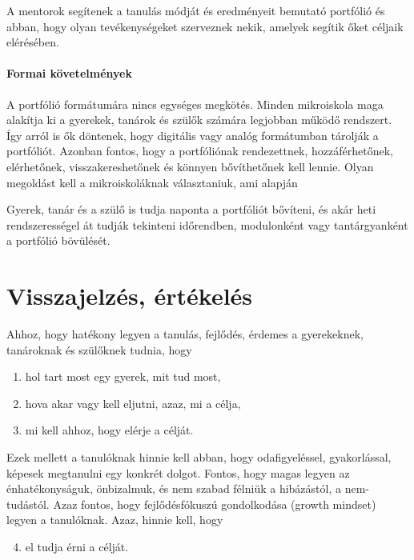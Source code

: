 A mentorok segítenek a tanulás módját és eredményeit bemutató portfólió és abban, hogy olyan tevékenységeket szerveznek nekik, amelyek segítik őket céljaik elérésében.

\paragraph{Formai követelmények}
A portfólió formátumára nincs egységes megkötés. Minden mikroiskola maga alakítja ki a gyerekek, tanárok és szülők számára legjobban működő rendszert. Így arról is ők döntenek, hogy digitális vagy analóg formátumban tárolják a portfóliót. Azonban fontos, hogy a portfóliónak rendezettnek, hozzáférhetőnek, elérhetőnek, visszakereshetőnek és könnyen bővíthetőnek kell lennie. Olyan megoldást kell a mikroiskoláknak választaniuk, ami alapján

Gyerek, tanár és a szülő is tudja naponta a portfóliót bővíteni, és akár heti rendszerességel át tudják tekinteni időrendben, modulonként vagy tantárgyanként a portfólió bövülését.

\section{Visszajelzés, értékelés}
\label{sec:ertekeles}
Ahhoz, hogy hatékony legyen a tanulás, fejlődés, érdemes a gyerekeknek, tanároknak és szülőknek tudnia, hogy
\begin{enumerate}
\item hol tart most egy gyerek, mit tud most,
\item hova akar vagy kell eljutni, azaz, mi a célja,
\item mi kell ahhoz, hogy elérje a célját.
\end{enumerate}
Ezek mellett a tanulóknak hinnie kell abban, hogy odafigyeléssel, gyakorlással, képesek megtanulni egy konkrét dolgot. Fontos, hogy magas legyen az énhatékonyságuk, önbizalmuk, és nem szabad félniük a hibázástól, a nem-tudástól. Azaz fontos, hogy fejlődésfókuszú gondolkodása (growth mindset)\citep{growthmindset} legyen a tanulóknak. Azaz, hinnie kell, hogy
\begin{enumerate}
  \setcounter{enumi}{3}
  \item el tudja érni a célját.
\end{enumerate}

